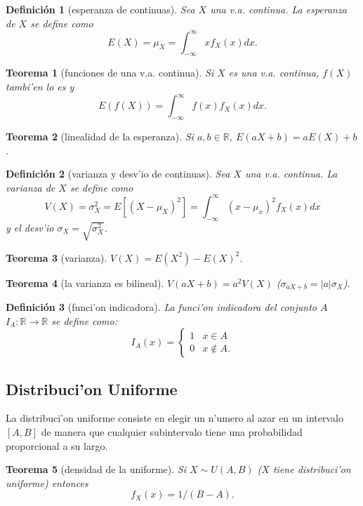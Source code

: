 \documentclass[a4paper,spanish]{article}
\newcommand{\R}[0]{\mathbb{R}}
\newtheorem{teo}{Teorema}
\newtheorem{defi}{Definici\'on}
\begin{document}
\begin{defi}[esperanza de continuas]
Sea $X$ una v.a. continua. La esperanza de $X$ se define como
$$E(X) = \mu_X = \int_{-\infty}^\infty x f_X(x) dx.$$
\end{defi}

\begin{teo}[funciones de una v.a. continua]
Si $X$ es una v.a. continua, $f(X)$ tambi'en lo es y
$$E(f(X)) = \int_{-\infty}^\infty f(x) f_X(x) dx.$$
\end{teo}

\begin{teo}[linealidad de la esperanza]
Si $a,b \in \R$, $E(aX+b) = aE(X)+b$.
\end{teo}

\begin{defi}[varianza y desv'io de continuas]
Sea $X$ una v.a. continua. La varianza de $X$ se define como
$$V(X) = \sigma^2_X = E[(X-\mu_X)^2] = 
	\int_{-\infty}^\infty (x - \mu_x)^2 f_X(x) dx$$
y el desv'io $\sigma_X = \sqrt{\sigma^2_X}$.
\end{defi}

\begin{teo}[varianza]
$V(X) = E(X^2) - E(X)^2$.
\end{teo}

\begin{teo}[la varianza es bilineal]
$V(aX+b) = a^2 V(X)$ ($\sigma_{aX+b} = |a|\sigma_X$).
\end{teo}

\begin{defi}[funci'on indicadora]
La funci'on indicadora del conjunto $A$ $I_A : \R \to \R$ se define como:
$$I_A(x) = \begin{cases} 1 & x \in A \\ 0 & x \notin A. \end{cases}$$
\end{defi}

\subsection{Distribuci'on Uniforme}

La distribuci'on uniforme consiste en elegir un n'umero al azar en un 
intervalo $[A,B]$ de manera que cualquier subintervalo tiene una probabilidad
proporcional a su largo.

\begin{teo}[densidad de la uniforme]
Si $X \sim U(A,B)$ ($X$ tiene distribuci'on uniforme) entonces
$$f_X(x) = 1/(B-A).$$
\end{teo}
\end{document}
